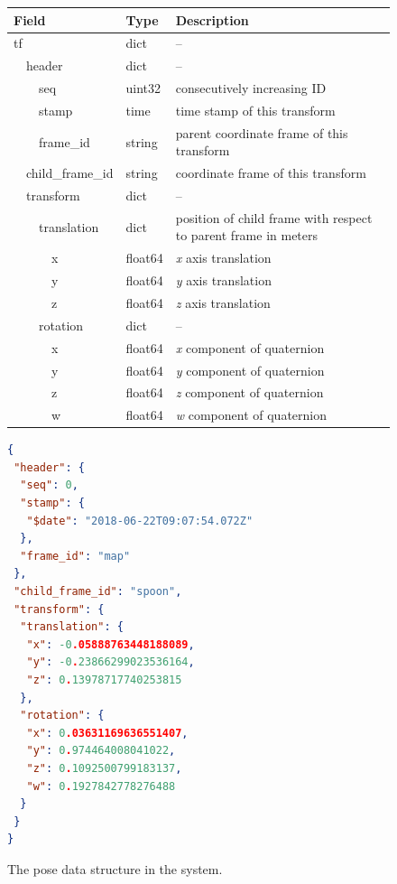 \def\arraystretch{1.1}%
\begin{figure}[htb]
\begin{center}\begin{tabular}{ >{\ttfamily}p{3.5cm} >{\ttfamily}p{2cm} p{5cm} }
\toprule
\bf Field   & \bf Type & \bf Description \\ \midrule
tf			& dict	& -- \\
\ \ header		& dict		& -- \\
\ \ \ \ seq		& uint32	& consecutively increasing ID \\
\ \ \ \ stamp		& time		& time stamp of this transform \\
\ \ \ \ frame\_id	& string	& parent coordinate frame of this transform \\
\ \ child\_frame\_id	& string	& coordinate frame of this transform \\
\ \ transform		& dict		& -- \\
\ \ \ \ translation	& dict		& position of child frame with respect to parent frame in meters \\
\ \ \ \ \ \ x		& float64	& \emph{x} axis translation \\
\ \ \ \ \ \ y		& float64	& \emph{y} axis translation \\
\ \ \ \ \ \ z		& float64	& \emph{z} axis translation \\
\ \ \ \ rotation	& dict		& -- \\
\ \ \ \ \ \ x		& float64	& \emph{x} component of quaternion \\
\ \ \ \ \ \ y		& float64	& \emph{y} component of quaternion \\
\ \ \ \ \ \ z		& float64	& \emph{z} component of quaternion \\
\ \ \ \ \ \ w		& float64	& \emph{w} component of quaternion \\
\bottomrule
\end{tabular}\end{center}

\begin{lstlisting}[language=json,firstnumber=1]
{
 "header": {
  "seq": 0,
  "stamp": {
   "$date": "2018-06-22T09:07:54.072Z"
  },
  "frame_id": "map"
 },
 "child_frame_id": "spoon",
 "transform": {
  "translation": {
   "x": -0.05888763448188089,
   "y": -0.23866299023536164,
   "z": 0.13978717740253815
  },
  "rotation": {
   "x": 0.03631169636551407,
   "y": 0.974464008041022,
   "z": 0.1092500799183137,
   "w": 0.1927842778276488
  }
 }
}

\end{lstlisting}
\caption{The pose data structure in the \ease system.}
\label{fig:pose_data}
\end{figure}

